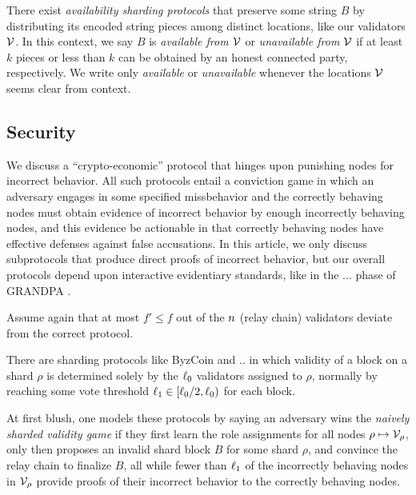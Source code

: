 There exist {\em availability sharding protocols} that preserve some string $B$ by distributing its encoded string pieces among distinct locations, like our validators $\mathcal{V}$.  In this context, we say $B$ is {\em available from $\mathcal{V}$} or {\em unavailable from $\mathcal{V}$} if at least $k$ pieces or less than $k$ can be obtained by an honest connected party, respectively.  We write only  {\em available} or {\em unavailable} whenever the locations $\mathcal{V}$ seems clear from context.


\subsection{Security}

We discuss a ``crypto-economic'' protocol that hinges upon punishing nodes for incorrect behavior.  All such protocols entail a conviction game in which an adversary engages in some specified missbehavior and the correctly behaving nodes must obtain evidence of incorrect behavior by enough incorrectly behaving nodes, and this evidence be actionable in that correctly behaving nodes have effective defenses against false accusations.  
In this article, we only discuss subprotocols that produce direct proofs of incorrect behavior, but our overall protocols depend upon interactive evidentiary standards, like in the ... phase of GRANDPA \cite{??}.

Assume again that at most $f' \le f$ out of the $n$ (relay chain) validators deviate from the correct protocol.


There are sharding protocols like ByzCoin \cite{ByzCoin} and .. in which validity of a block on a shard $\rho$ is determined solely by the $\ell_0$ validators assigned to $\rho$, normally by reaching some vote threshold $\ell_1 \in [\ell_0/2,\ell_0)$ for each block.

At first blush, one models these protocols by saying an adversary wins the {\em naively sharded validity game} if they first learn the role assignments for all nodes $\rho \mapsto \mathcal{V}_\rho$, only then proposes an invalid shard block $B$ for some shard $\rho$, and convince the relay chain to finalize $B$, all while fewer than $\ell_1$ of the incorrectly behaving nodes in $\mathcal{V}_\rho$ provide proofs of their incorrect behavior to the correctly behaving nodes.  

